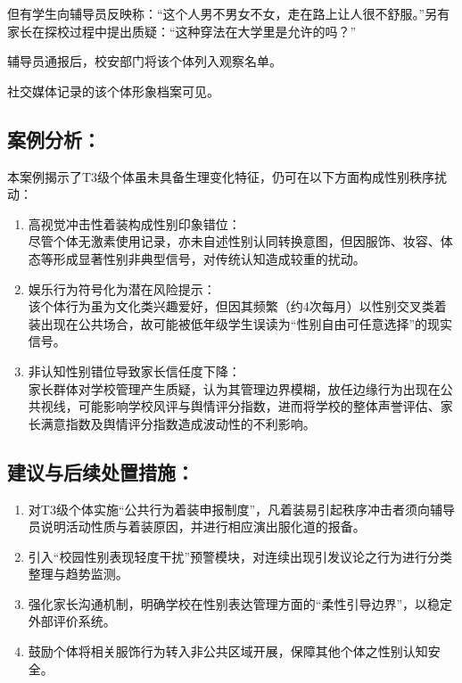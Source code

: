 \documentclass[]{ctexrep}
\begin{document}
	但有学生向辅导员反映称：“这个人男不男女不女，走在路上让人很不舒服。”另有家长在探校过程中提出质疑：“这种穿法在大学里是允许的吗？”
	
	辅导员通报后，校安部门将该个体列入观察名单。
	
	社交媒体记录的该个体形象档案可见\hyperref[附件4]{}。
	\subsection{案例分析：}
	本案例揭示了T3级个体虽未具备生理变化特征，仍可在以下方面构成性别秩序扰动：
	\begin{enumerate}
		\item 高视觉冲击性着装构成性别印象错位：\\
		尽管个体无激素使用记录，亦未自述性别认同转换意图，但因服饰、妆容、体态等形成显著性别非典型信号，对传统认知造成较重的扰动。
		
		\item 娱乐行为符号化为潜在风险提示：\\
		该个体行为虽为文化类兴趣爱好，但因其频繁（约4次每月）以性别交叉类着装出现在公共场合，故可能被低年级学生误读为“性别自由可任意选择”的现实信号。
		
		\item 非认知性别错位导致家长信任度下降：\\
		家长群体对学校管理产生质疑，认为其管理边界模糊，放任边缘行为出现在公共视线，可能影响学校风评与舆情评分指数，进而将学校的整体声誉评估、家长满意指数及舆情评分指数造成波动性的不利影响。
	\end{enumerate}
	\subsection{建议与后续处置措施：}
	\begin{enumerate}
		\item 对T3级个体实施“公共行为着装申报制度”，凡着装易引起秩序冲击者须向辅导员说明活动性质与着装原因，并进行相应演出服化道的报备。
		
		\item 引入“校园性别表现轻度干扰”预警模块，对连续出现引发议论之行为进行分类整理与趋势监测。
		
		\item 强化家长沟通机制，明确学校在性别表达管理方面的“柔性引导边界”，以稳定外部评价系统。
		
		\item 鼓励个体将相关服饰行为转入非公共区域开展，保障其他个体之性别认知安全。
	\end{enumerate}
	
\end{document}
